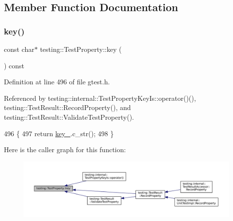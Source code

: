 \subsection{Member Function Documentation}
\mbox{\label{classtesting_1_1TestProperty_ad60435d4ad04ac030487d8998fc61c5f}} 
\subsubsection{\texorpdfstring{key()}{key()}}
{\footnotesize\ttfamily const char$\ast$ testing\+::\+Test\+Property\+::key (\begin{DoxyParamCaption}{ }\end{DoxyParamCaption}) const\hspace{0.3cm}{\ttfamily [inline]}}



Definition at line 496 of file gtest.\+h.



Referenced by testing\+::internal\+::\+Test\+Property\+Key\+Is\+::operator()(), testing\+::\+Test\+Result\+::\+Record\+Property(), and testing\+::\+Test\+Result\+::\+Validate\+Test\+Property().


\begin{DoxyCode}
496                           \{
497     \textcolor{keywordflow}{return} \hyperlink{classtesting_1_1TestProperty_a948544067d61e790bd37e234186fa708}{key\_}.c\_str();
498   \}
\end{DoxyCode}
Here is the caller graph for this function\+:
\nopagebreak
\begin{figure}[H]
\begin{center}
\leavevmode
\includegraphics[width=350pt]{classtesting_1_1TestProperty_ad60435d4ad04ac030487d8998fc61c5f_icgraph}
\end{center}
\end{figure}
\mbox{\label{classtesting_1_1TestProperty_a377245335d9f614cd06d1650e3358e1d}} 
